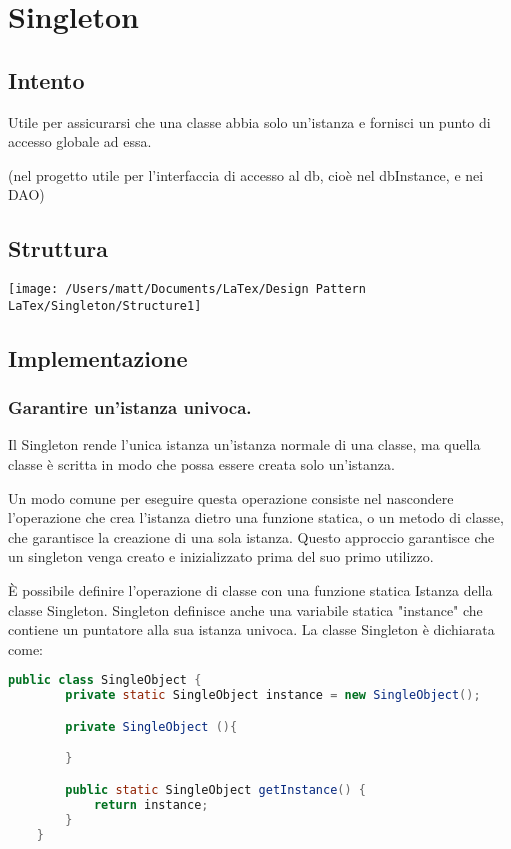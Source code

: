 \chapter{Singleton}
\section{Intento}

Utile per assicurarsi che una classe abbia solo un'istanza e fornisci un punto di accesso globale ad essa.

(nel progetto utile per l'interfaccia di accesso al db, cioè nel dbInstance, e nei DAO)


\section{Struttura}

\texttt{[image: /Users/matt/Documents/LaTex/Design Pattern LaTex/Singleton/Structure1]}


\section{Implementazione}

\subsection{Garantire un'istanza univoca.}
Il Singleton rende l'unica istanza un'istanza normale di una classe, ma quella classe è scritta in modo che possa essere creata solo un'istanza.

Un modo comune per eseguire questa operazione consiste nel nascondere l'operazione che crea l'istanza dietro una funzione statica, o un metodo di classe, che garantisce la creazione di una sola istanza. Questo approccio garantisce che un singleton venga creato e inizializzato prima del suo primo utilizzo.

È possibile definire l'operazione di classe con una funzione statica Istanza della classe Singleton. Singleton definisce anche una variabile statica "instance" che contiene un puntatore alla sua istanza univoca.
La classe Singleton è dichiarata come:

\begin{lstlisting}[language=java]
    public class SingleObject {
        private static SingleObject instance = new SingleObject();

        private SingleObject (){

        }

        public static SingleObject getInstance() {
            return instance;
        }
    }
\end{lstlisting}

